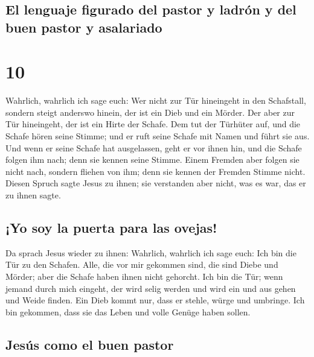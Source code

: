 \hypertarget{el-lenguaje-figurado-del-pastor-y-ladruxf3n-y-del-buen-pastor-y-asalariado}{%
\subsection{El lenguaje figurado del pastor y ladrón y del buen pastor y
asalariado}\label{el-lenguaje-figurado-del-pastor-y-ladruxf3n-y-del-buen-pastor-y-asalariado}}

\hypertarget{section-9}{%
\section{10}\label{section-9}}

 Wahrlich, wahrlich ich sage euch: Wer nicht zur Tür
hineingeht in den Schafstall, sondern steigt anderswo hinein, der ist
ein Dieb und ein Mörder.  Der aber zur Tür hineingeht, der
ist ein Hirte der Schafe.  Dem tut der Türhüter auf, und
die Schafe hören seine Stimme; und er ruft seine Schafe mit Namen und
führt sie aus.  Und wenn er seine Schafe hat ausgelassen,
geht er vor ihnen hin, und die Schafe folgen ihm nach; denn sie kennen
seine Stimme.  Einem Fremden aber folgen sie nicht nach,
sondern fliehen von ihm; denn sie kennen der Fremden Stimme nicht.
 Diesen Spruch sagte Jesus zu ihnen; sie verstanden aber
nicht, was es war, das er zu ihnen sagte.

\hypertarget{yo-soy-la-puerta-para-las-ovejas}{%
\subsection{¡Yo soy la puerta para las
ovejas!}\label{yo-soy-la-puerta-para-las-ovejas}}

 Da sprach Jesus wieder zu ihnen: Wahrlich, wahrlich ich
sage euch: Ich bin die Tür zu den Schafen.  Alle, die vor
mir gekommen sind, die sind Diebe und Mörder; aber die Schafe haben
ihnen nicht gehorcht.  Ich bin die Tür; wenn jemand durch
mich eingeht, der wird selig werden und wird ein und aus gehen und Weide
finden.  Ein Dieb kommt nur, dass er stehle, würge und
umbringe. Ich bin gekommen, dass sie das Leben und volle Genüge haben
sollen.

\hypertarget{jesuxfas-como-el-buen-pastor}{%
\subsection{Jesús como el buen
pastor}\label{jesuxfas-como-el-buen-pastor}}

